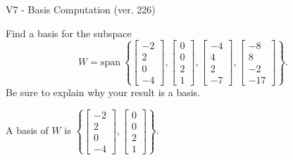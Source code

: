 \begin{exercise}
  \begin{exerciseTitle}V7 - Basis Computation (ver. 226)\end{exerciseTitle}
  \begin{exerciseStatement}
    Find a basis for the subspace 
\[W=\mathrm{span}\ \left\{\left[\begin{array}{r}
-2 \\
2 \\
0 \\
-4
\end{array}\right] , \left[\begin{array}{r}
0 \\
0 \\
2 \\
1
\end{array}\right] , \left[\begin{array}{r}
-4 \\
4 \\
2 \\
-7
\end{array}\right] , \left[\begin{array}{r}
-8 \\
8 \\
-2 \\
-17
\end{array}\right]\right\}.\]
 Be sure to explain why your result is a basis.


  \end{exerciseStatement}
  \begin{exerciseAnswer}
   A basis of \(W\) is  \(\left\{\left[\begin{array}{r}
-2 \\
2 \\
0 \\
-4
\end{array}\right] , \left[\begin{array}{r}
0 \\
0 \\
2 \\
1
\end{array}\right]\right\}\).
  


  \end{exerciseAnswer}
\end{exercise}